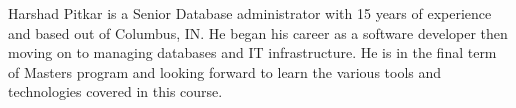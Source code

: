 Harshad Pitkar is a Senior Database administrator with 15 years of experience 
and based out of Columbus, IN. He began his career as a software developer then 
moving on to managing databases and IT infrastructure. He is in the final term 
of Masters program and looking forward to learn the various tools and technologies 
covered in this course.

